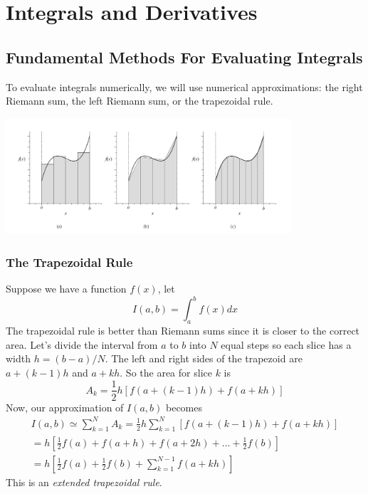 \chapter{Integrals and Derivatives}
    \section{Fundamental Methods For Evaluating Integrals}
        To evaluate integrals numerically, we will use numerical approximations: the right Riemann sum, the left Riemann sum, or the trapezoidal rule.
        \begin{center}
            \includegraphics[width=300pt]{integral_approx.png}
        \end{center}
        \subsection{The Trapezoidal Rule}
            Suppose we have a function $f(x)$, let
            \begin{equation*}
                I(a, b) = \int_a^b f(x) dx
            \end{equation*}
            The trapezoidal rule is better than Riemann sums since it is closer to the correct area. Let's divide the interval from $a$ to $b$ into $N$ equal steps so each slice has a width $h = (b - a) / N$. The left and right sides of the trapezoid are $a + (k - 1) h$ and $a + kh$. So the area for slice $k$ is
            \begin{equation*}
                A_k = \frac{1}{2}h[f(a + (k - 1)h) + f(a + kh)]
            \end{equation*}
            Now, our approximation of $I(a, b)$ becomes
            \begin{align*}
                I(a, b) \simeq \sum_{k=1}^N A_k = \frac{1}{2}h \sum_{k=1}^N [f(a + (k - 1)h) + f(a + kh)] \\
                 = h[\frac{1}{2}f(a) + f(a + h) + f(a + 2h) + \dots + \frac{1}{2}f(b)] \\
                 = h[\frac{1}{2}f(a) + \frac{1}{2}f(b) + \sum_{k=1}^{N-1}f(a + kh)]
            \end{align*}
            This is an \textit{extended trapezoidal rule}.